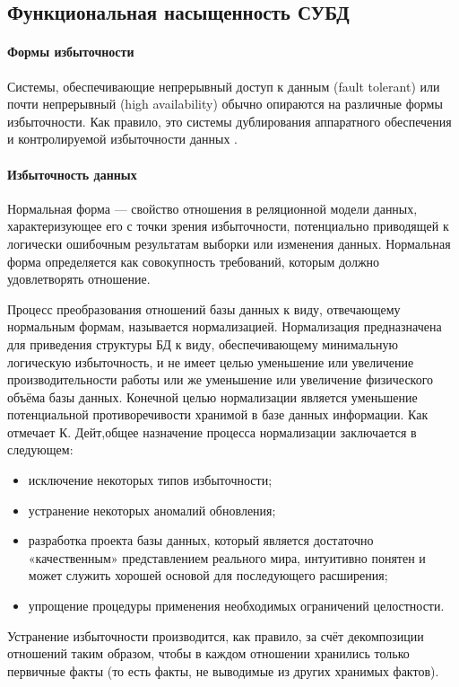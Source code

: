 \subsection{Функциональная насыщенность СУБД}
\paragraph{Формы избыточности}
Системы, обеспечивающие непрерывный доступ к данным (fault tolerant) или почти
непрерывный (high availability) обычно опираются на различные формы избыточности.
Как правило, это системы дублирования аппаратного обеспечения и контролируемой
избыточности данных \autocite{Baron}.

\paragraph{Избыточность данных}
Нормальная форма — свойство отношения в реляционной модели данных, характеризующее его с точки зрения избыточности, потенциально приводящей к логически ошибочным результатам выборки или изменения данных. Нормальная форма определяется как совокупность требований, которым должно удовлетворять отношение.

Процесс преобразования отношений базы данных к виду, отвечающему нормальным формам, называется нормализацией. Нормализация предназначена для приведения структуры БД к виду, обеспечивающему минимальную логическую избыточность, и не имеет целью уменьшение или увеличение производительности работы или же уменьшение или увеличение физического объёма базы данных. Конечной целью нормализации является уменьшение потенциальной противоречивости хранимой в базе данных информации. Как отмечает К. Дейт,общее назначение процесса нормализации заключается в следующем:
\begin{itemize}
    \item исключение некоторых типов избыточности;
    \item устранение некоторых аномалий обновления;
    \item разработка проекта базы данных, который является достаточно «качественным» представлением реального мира, интуитивно понятен и может служить хорошей основой для последующего расширения;
    \item упрощение процедуры применения необходимых ограничений целостности.
\end{itemize}

Устранение избыточности производится, как правило, за счёт декомпозиции отношений таким образом, чтобы в каждом отношении хранились только первичные факты (то есть факты, не выводимые из других хранимых фактов). \\


